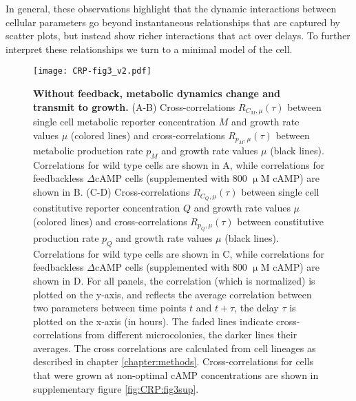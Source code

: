 In general, these observations highlight that the dynamic interactions between cellular parameters go beyond instantaneous relationships that are captured by scatter plots, but instead show richer interactions that act over delays. 
To further interpret these relationships we turn to a minimal model of the cell.


\begin{figure}
	\centering
	\texttt{[image: CRP-fig3\_v2.pdf]}
	\caption{ 
		\textbf{Without feedback, metabolic dynamics change and transmit to growth.}
		(A-B) Cross-correlations $R_{C_M,\mu}(\tau)$ between single cell metabolic reporter concentration $M$ and growth rate values $\mu$ (colored lines) and 
		cross-correlations $R_{p_M,\mu}(\tau)$ between metabolic production rate $p_M$ and growth rate values $\mu$ (black lines). 
		Correlations for wild type cells are shown in A, while correlations for feedbackless $\Delta$cAMP cells (supplemented with 800 $\upmu$M cAMP) are shown in B.
		(C-D) Cross-correlations $R_{C_Q,\mu}(\tau)$ between single cell constitutive reporter concentration $Q$ and growth rate values $\mu$ (colored lines) and 
		cross-correlations $R_{p_Q,\mu}(\tau)$ between constitutive production rate $p_Q$ and growth rate values $\mu$ (black lines). 
		Correlations for wild type cells are shown in C, while correlations for feedbackless $\Delta$cAMP cells (supplemented with 800 $\upmu$M cAMP) are shown in D.
		For all panels, the correlation (which is normalized) is plotted on the y-axis, and reflects the average correlation between two parameters between time points $t$ and $t+\tau$, 
		the delay $\tau$ is plotted on the x-axis (in hours). The faded lines indicate cross-correlations from different microcolonies, the darker lines their averages. The cross correlations are calculated from cell lineages as described in chapter \ref{chapter:methods}.
		Cross-correlations for cells that were grown at non-optimal cAMP concentrations are shown in supplementary figure \ref{fig:CRP:fig3sup}.
	}
	\label{fig:CRP:fig3}
\end{figure}



